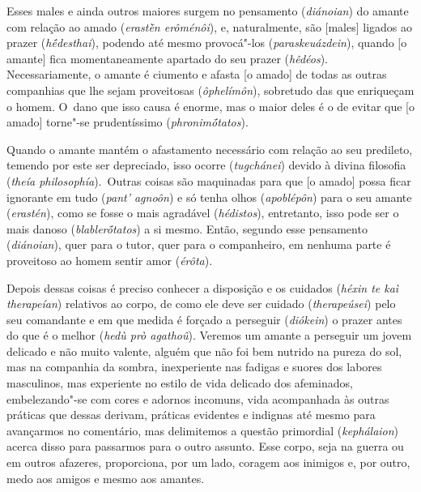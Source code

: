 Esses males e ainda outros maiores surgem no pensamento
(\emph{diánoian}) do amante com relação ao amado (\emph{erastḕn
erôménôi}), e, naturalmente, são [males] ligados ao prazer
(\emph{hḗdesthai}), podendo até mesmo provocá"-los
(\emph{paraskeuázdein}), quando [o amante] fica momentaneamente
apartado do seu prazer (\emph{hêdéos}). Necessariamente, o amante é
ciumento e afasta [o amado] de todas as outras companhias que lhe
sejam proveitosas (\emph{ôphelímôn}), \bekker{[239b]} sobretudo das que
enriqueçam o homem. O~dano que isso causa é enorme, mas o maior deles é
o de evitar que [o amado] torne"-se prudentíssimo
(\emph{phronimṓtatos}).

Quando o amante mantém o afastamento necessário com relação ao seu
predileto, temendo por este ser depreciado, isso ocorre
(\emph{tugchánei}) devido à divina filosofia (\emph{theía
philosophía}).~Outras coisas são maquinadas para que [o amado] possa
ficar ignorante em tudo (\emph{pant' agnoôn}) e só tenha olhos
(\emph{apoblépôn}) para o seu amante (\emph{erastén}), como se fosse o
mais agradável (\emph{hédistos}), entretanto, isso pode ser o mais danoso
(\emph{blablerṓtatos}) a si mesmo. \bekker{[239c]} Então, segundo esse
pensamento (\emph{diánoian}), quer para o tutor, quer para o
companheiro, em nenhuma parte é proveitoso ao homem sentir amor
(\emph{érôta}).

Depois dessas coisas é preciso conhecer a disposição e os cuidados
(\emph{héxin te kaì therapeían}) relativos ao corpo, de como ele deve
ser cuidado (\emph{therapeúsei}) pelo seu comandante e em que medida é
forçado a perseguir (\emph{diókein}) o prazer antes do que é o melhor
(\emph{hedù prò agathoû}). Veremos um amante a perseguir um jovem
delicado e não muito valente, alguém que não foi bem nutrido na pureza
do sol, mas na companhia da sombra, inexperiente nas fadigas e suores
dos labores masculinos, mas experiente no estilo de vida delicado dos
afeminados, \bekker{[239d]} embelezando"-se com cores e adornos incomuns, vida
acompanhada às outras práticas que dessas derivam, práticas evidentes e
indignas até mesmo para avançarmos no comentário, mas delimitemos a
questão primordial (\emph{kephálaion}) acerca disso para passarmos para
o outro assunto. Esse corpo, seja na guerra ou em outros afazeres,
proporciona, por um lado, coragem aos inimigos e, por outro, medo aos
amigos e mesmo aos amantes.

